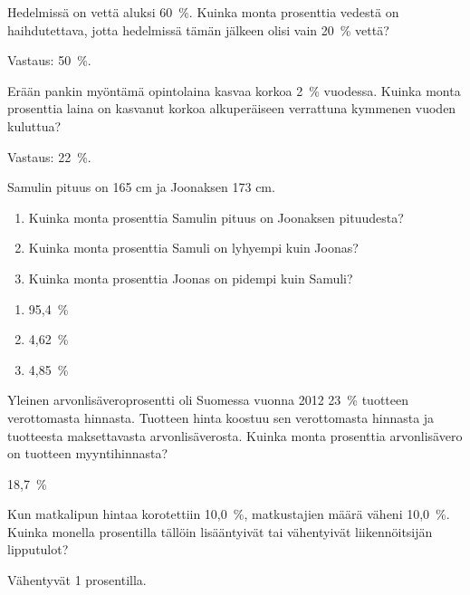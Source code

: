 \begin{tehtava}
	Hedelmissä on vettä aluksi 60~\%. Kuinka monta prosenttia vedestä on 
	haihdutettava, jotta hedelmissä tämän jälkeen olisi vain 20~\% vettä?
	\begin{vastaus}
		Vastaus: 50~\%.
	\end{vastaus}
\end{tehtava}

\begin{tehtava}
    Erään pankin myöntämä opintolaina kasvaa korkoa 2~\% vuodessa. Kuinka monta 
    prosenttia laina on kasvanut korkoa alkuperäiseen verrattuna kymmenen vuoden kuluttua?
    \begin{vastaus}
        Vastaus: 22~\%.
    \end{vastaus}
\end{tehtava}

\begin{tehtava}

Samulin pituus on 165 cm ja Joonaksen 173 cm.
\begin{enumerate}
\item Kuinka monta prosenttia Samulin pituus on Joonaksen pituudesta?
\item Kuinka monta prosenttia Samuli on lyhyempi kuin Joonas?
\item Kuinka monta prosenttia Joonas on pidempi kuin Samuli?
\end{enumerate}

\begin{vastaus}
\begin{enumerate}
\item 95,4~\%
\item 4,62~\%
\item 4,85~\%
\end{enumerate}
\end{vastaus}

\end{tehtava}

\begin{tehtava}
	Yleinen arvonlisäveroprosentti oli Suomessa vuonna 2012 23~\% tuotteen verottomasta 
	hinnasta. Tuotteen hinta koostuu sen verottomasta hinnasta 
	ja tuotteesta maksettavasta arvonlisäverosta. Kuinka monta 
	prosenttia arvonlisävero on tuotteen myyntihinnasta?
	\begin{vastaus}
		18,7~\%
	\end{vastaus}
\end{tehtava}

\begin{tehtava}
	Kun matkalipun hintaa korotettiin 10,0~\%, matkustajien määrä väheni 10,0~\%. 
	Kuinka monella prosentilla tällöin lisääntyivät tai vähentyivät liikennöitsijän 
	lipputulot?
	\begin{vastaus}
		Vähentyvät 1 prosentilla.
	\end{vastaus}
\end{tehtava}

